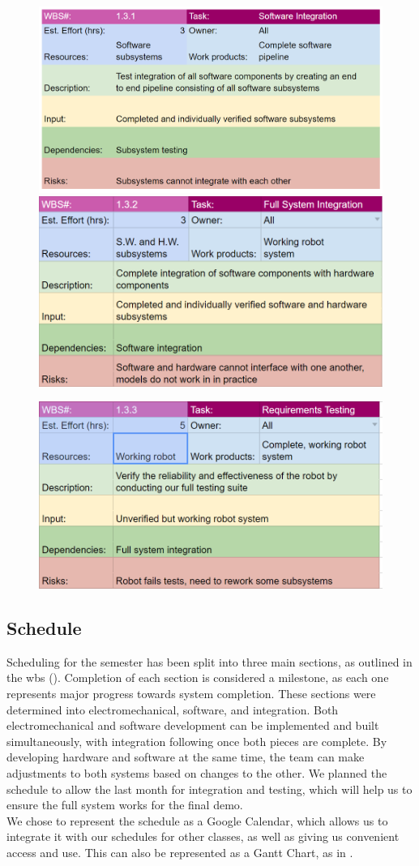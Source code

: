 \begin{figure}[h!]
\centering
\includegraphics[width=0.49\columnwidth]{wbs_schedule/wbs_dict_int1.PNG}
\includegraphics[width=0.49\columnwidth]{wbs_schedule/wbs_dict_int2.PNG}
\label{fig:int1int2}
\end{figure}
\begin{figure}[h!]
\centering
\includegraphics[width=0.49\columnwidth]{wbs_schedule/wbs_dict_int3.PNG}
\label{fig:int3}
\end{figure}

\clearpage

\subsection{Schedule}
\label{sec:schedule}
Scheduling for the semester has been split into three main sections, as outlined in the wbs (). Completion of each section is considered a milestone, as each one represents major progress towards system completion. These sections were determined into electromechanical, software, and integration. Both electromechanical and software development can be implemented and built simultaneously, with integration following once both pieces are complete. By developing hardware and software at the same time, the team can make adjustments to both systems based on changes to the other. We planned the schedule to allow the last month for integration and testing, which will help us to ensure the full system works for the final demo. \\
We chose to represent the schedule as a Google Calendar, which allows us to integrate it with our schedules for other classes, as well as giving us convenient access and use. This can also be represented as a Gantt Chart, as in .

